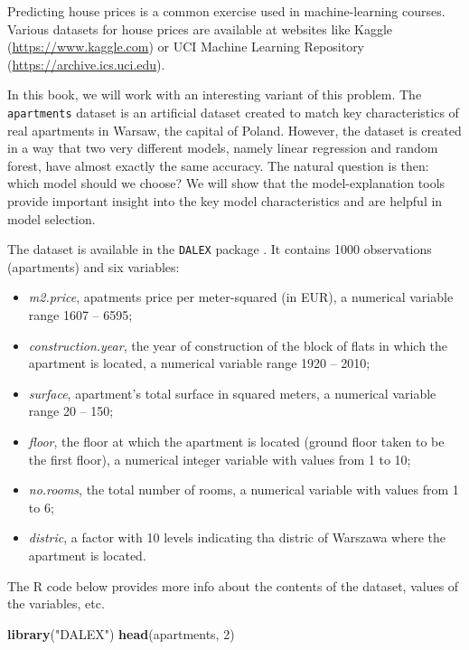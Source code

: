 \documentclass[12pt,]{krantz}
\newenvironment{Shaded}{\begin{snugshade}}{\end{snugshade}}
\newcommand{\DecValTok}[1]{\textcolor[rgb]{0.00,0.00,0.81}{#1}}
\newcommand{\KeywordTok}[1]{\textcolor[rgb]{0.13,0.29,0.53}{\textbf{#1}}}
\newcommand{\NormalTok}[1]{#1}
\newcommand{\StringTok}[1]{\textcolor[rgb]{0.31,0.60,0.02}{#1}}
\providecommand{\tightlist}{%
  \setlength{\itemsep}{0pt}\setlength{\parskip}{0pt}}
\begin{document}
Predicting house prices is a common exercise used in machine-learning courses. Various datasets for house prices are available at websites like Kaggle (\url{https://www.kaggle.com}) or UCI Machine Learning Repository (\url{https://archive.ics.uci.edu}).

In this book, we will work with an interesting variant of this problem. The \texttt{apartments} dataset is an artificial dataset created to match key characteristics of real apartments in Warsaw, the capital of Poland. However, the dataset is created in a way that two very different models, namely linear regression and random forest, have almost exactly the same accuracy. The natural question is then: which model should we choose? We will show that the model-explanation tools provide important insight into the key model characteristics and are helpful in model selection.

The dataset is available in the \texttt{DALEX} package \citep{DALEX}. It contains 1000 observations (apartments) and six variables:

\begin{itemize}
\tightlist
\item
  \emph{m2.price}, apatments price per meter-squared (in EUR), a numerical variable range 1607 -- 6595;
\item
  \emph{construction.year}, the year of construction of the block of flats in which the apartment is located, a numerical variable range 1920 -- 2010;
\item
  \emph{surface}, apartment's total surface in squared meters, a numerical variable range 20 -- 150;
\item
  \emph{floor}, the floor at which the apartment is located (ground floor taken to be the first floor), a numerical integer variable with values from 1 to 10;
\item
  \emph{no.rooms}, the total number of rooms, a numerical variable with values from 1 to 6;
\item
  \emph{distric}, a factor with 10 levels indicating tha distric of Warszawa where the apartment is located.
\end{itemize}

The R code below provides more info about the contents of the dataset, values of the variables, etc.

\begin{Shaded}
\begin{Highlighting}[]
\KeywordTok{library}\NormalTok{(}\StringTok{"DALEX"}\NormalTok{)}
\KeywordTok{head}\NormalTok{(apartments, }\DecValTok{2}\NormalTok{)}
\end{Highlighting}
\end{Shaded}
\end{document}
